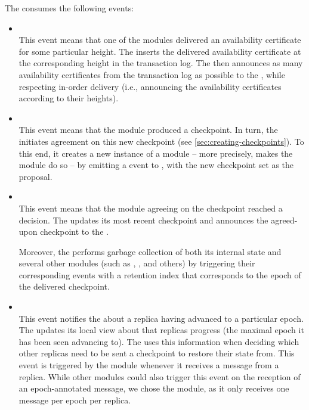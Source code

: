\documentclass{article}
\begin{document}
The  consumes the following events:
\begin{itemize}

    \item {}\\
    This event means that one of the  modules delivered an availability certificate
    for some particular height.
    The  inserts the delivered availability certificate
    at the corresponding height in the transaction log.
    The  then announces as many availability certificates from the transaction log as possible
    to the , while respecting in-order delivery
    (i.e., announcing the availability certificates according to their heights).

    \item {}\\
    This event means that the  module produced a checkpoint.
    In turn, the  initiates agreement on this new checkpoint (see \cref{sec:creating-checkpoints}).
    To this end, it creates a new instance of a  module -- more precisely,
    makes the  module do so -- by emitting a  event to ,
    with the new checkpoint set as the proposal.

    \item {}\\
    This event means that the  module agreeing on the checkpoint reached a decision.
    The  updates its most recent checkpoint
    and announces the agreed-upon checkpoint to the .

    Moreover, the  performs garbage collection of both its internal state
    and several other modules (such as , , and others)
    by triggering their corresponding  events with a retention index
    that corresponds to the epoch of the delivered checkpoint.

    \item {}\\
    This event notifies the  about a replica having advanced to a particular epoch.
    The  updates its local view about that replicas progress
    (the maximal epoch it has been seen advancing to).
    The  uses this information when deciding which other replicas need to be sent a checkpoint
    to restore their state from.
    This event is triggered by the  module whenever it receives a message from a replica.
    While other modules could also trigger this event on the reception of an epoch-annotated message,
    we chose the  module, as it only receives one message per epoch per replica.


\end{itemize}
\end{document}
